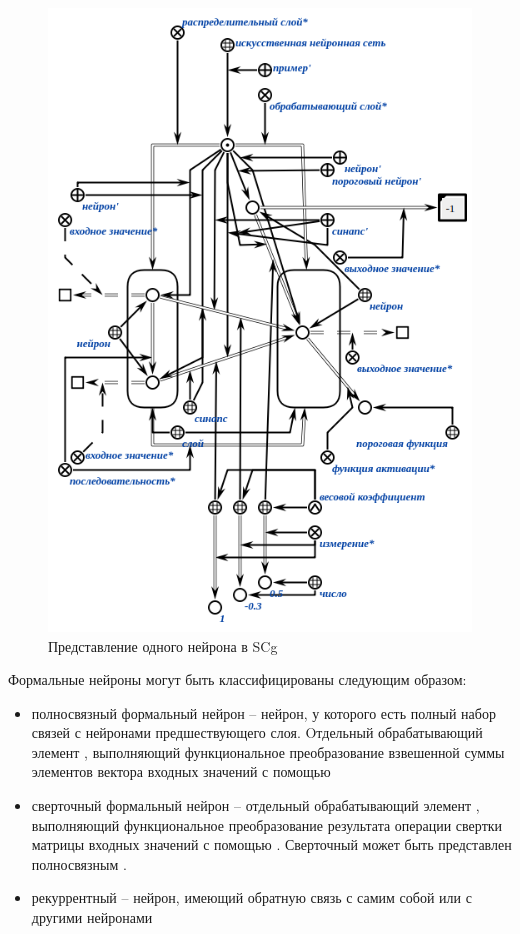 \begin{figure}[H]
	\includegraphics[scale=0.8]{author/part3/figures/neural_network_scg.png}
	\caption{Представление одного нейрона в SCg}
	\label{fig:nn_scg}
\end{figure}

Формальные нейроны могут быть классифицированы следующим образом:

\begin{itemize}
		\item полносвязный формальный нейрон -- нейрон, у которого есть полный набор связей с нейронами предшествующего слоя. Oтдельный обрабатывающий элемент , выполняющий функциональное преобразование взвешенной суммы элементов вектора входных значений с помощью 
	 \item сверточный формальный нейрон -- отдельный обрабатывающий элемент , выполняющий функциональное преобразование результата операции свертки матрицы входных значений с помощью . Сверточный  может быть представлен полносвязным .
	\item рекуррентный  -- нейрон, имеющий обратную связь с самим собой или с другими нейронами 
\end{itemize}

